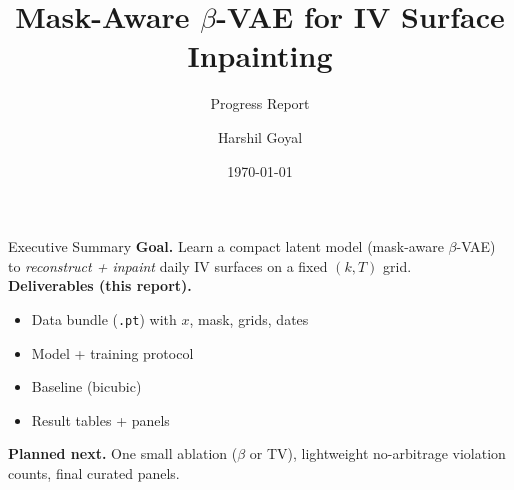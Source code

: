 \documentclass[11pt,aspectratio=169]{beamer}
\title[PRML Progress]{Mask-Aware $\beta$-VAE for IV Surface Inpainting}
\subtitle{Progress Report}
\author{Harshil Goyal}
\institute{EE5610: Term Project}
\date{\today}
\begin{document}
\begin{frame}
    \titlepage
\end{frame}

\begin{frame}{Executive Summary}
    \textbf{Goal.} Learn a compact latent model (mask-aware $\beta$-VAE) to \emph{reconstruct + inpaint} daily IV surfaces on a fixed $(k,T)$ grid.\\[3pt]
    \textbf{Deliverables (this report).}
    \begin{itemize}
        \item Data bundle (\texttt{.pt}) with $x$, mask, grids, dates
        \item Model + training protocol
        \item Baseline (bicubic)
        \item Result tables + panels
    \end{itemize}
    \textbf{Planned next.} One small ablation ($\beta$ or TV), lightweight no-arbitrage violation counts, final curated panels.
\end{frame}
\end{document}

